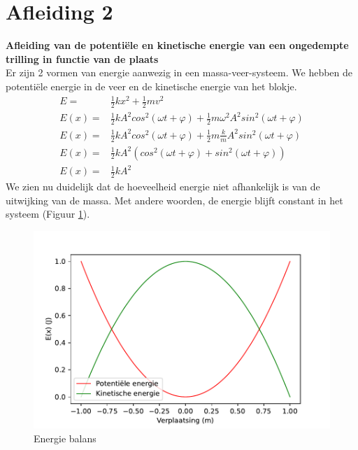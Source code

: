 \documentclass[a4paper,kul]{kulakarticle} %
\begin{document}
\newpage
\section{Afleiding 2}
\textbf{Afleiding van de potentiële en kinetische energie van een ongedempte trilling in functie van de plaats}
\\

Er zijn 2 vormen van energie aanwezig in een massa-veer-systeem. We hebben de potentiële energie in de veer en de kinetische energie van het blokje.
\begin{align*}
	E = & \frac{1}{2}kx^2 + \frac{1}{2}mv^2\\
	E(x) = & \frac{1}{2}k A^2cos^2(\omega t +\varphi) + \frac{1}{2}m \omega^2 A^2 sin^2(\omega t + \varphi)\\
	E(x) = & \frac{1}{2}k A^2cos^2(\omega t +\varphi) + \frac{1}{2}m \frac{k}{m} A^2 sin^2(\omega t + \varphi)\\
	E(x) = & \frac{1}{2} k A^2 (cos^2(\omega t +\varphi) + sin^2(\omega t + \varphi))\\
	E(x) = & \frac{1}{2} k A^2
\end{align*} 
We zien nu duidelijk dat de hoeveelheid energie niet afhankelijk is van de uitwijking van de massa. Met andere woorden, de energie blijft constant in het systeem (Figuur \ref{fig:energiebalans}).
\begin{figure}[htbp]
	\centering
	\includegraphics[width=0.7\linewidth]{Energie_Balans}
	\caption[Energie balans]{Energie balans}
	\label{fig:energiebalans}
\end{figure}

\newpage
\end{document}
